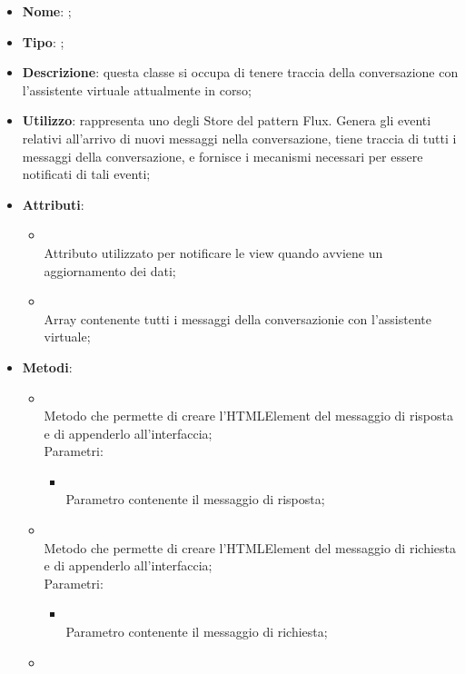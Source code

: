 \begin{itemize}
	\item \textbf{Nome}: ;
	\item \textbf{Tipo}: ;
	\item \textbf{Descrizione}: questa classe si occupa di tenere traccia della conversazione con l'assistente virtuale attualmente in corso;
	\item \textbf{Utilizzo}: rappresenta uno degli Store del pattern Flux. Genera gli eventi relativi all'arrivo di nuovi messaggi nella conversazione, tiene traccia di tutti i messaggi della conversazione, e fornisce i mecanismi necessari per essere notificati di tali eventi;
	\item \textbf{Attributi}:
	\begin{itemize}
		\item[]  \\
		Attributo utilizzato per notificare le view quando avviene un aggiornamento dei dati;
		\item[]  \\
		Array contenente tutti i messaggi della conversazionie con l'assistente virtuale;
	\end{itemize}
	\item \textbf{Metodi}:
	\begin{itemize}
		\item[]  \\
		Metodo che permette di creare l'HTMLElement del messaggio di risposta e di appenderlo all'interfaccia;\\
		Parametri:
		\begin{itemize}
			\item {} \\
			Parametro contenente il messaggio di risposta;
		\end{itemize}
		\item[]  \\
		Metodo che permette di creare l'HTMLElement del messaggio di richiesta e di appenderlo all'interfaccia;\\
		Parametri:
		\begin{itemize}
			\item {} \\
			Parametro contenente il messaggio di richiesta;
		\end{itemize}
		\item[]  \\

\end{itemize}
\end{itemize}
